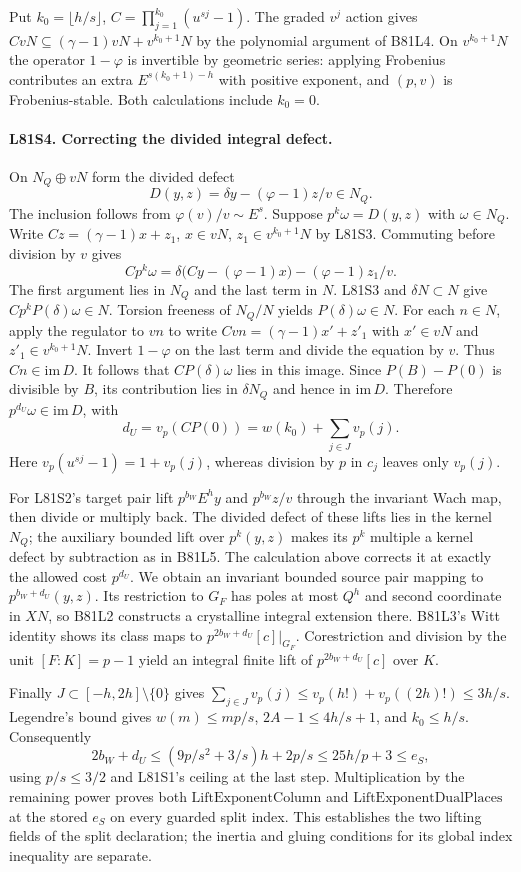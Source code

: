 Put $k_0=\lfloor h/s\rfloor$, $C=\prod_{j=1}^{k_0}(u^{sj}-1)$.
The graded $v^j$ action gives
$CvN\subseteq(\gamma-1)vN+v^{k_0+1}N$ by the polynomial
argument of B81L4. On $v^{k_0+1}N$ the operator $1-\varphi$
is invertible by geometric series: applying Frobenius contributes
an extra $E^{s(k_0+1)-h}$ with positive exponent, and $(p,v)$
is Frobenius-stable. Both calculations include $k_0=0$.

\paragraph{L81S4. Correcting the divided integral defect.}
On $N_Q\oplus vN$ form the divided defect
\[
           D(y,z)=\delta y-(\varphi-1)z/v\in N_Q .
\]
The inclusion follows from $\varphi(v)/v\sim E^s$. Suppose
$p^k\omega=D(y,z)$ with $\omega\in N_Q$. Write
$Cz=(\gamma-1)x+z_1$, $x\in vN$, $z_1\in v^{k_0+1}N$
by L81S3. Commuting before division by $v$ gives
\[
 Cp^k\omega=\delta\big(Cy-(\varphi-1)x\big)
                      -(\varphi-1)z_1/v .
\]
The first argument lies in $N_Q$ and the last term in $N$.
L81S3 and $\delta N\subset N$ give $Cp^k P(\delta)\omega\in N$.
Torsion freeness of $N_Q/N$ yields $P(\delta)\omega\in N$.
For each $n\in N$, apply the regulator to $vn$ to write
$Cvn=(\gamma-1)x'+z'_1$ with $x'\in vN$ and
$z'_1\in v^{k_0+1}N$. Invert $1-\varphi$ on the last term
and divide the equation by $v$. Thus $Cn\in\mathrm{im}\,D$.
It follows that $CP(\delta)\omega$ lies in this image.
Since $P(B)-P(0)$ is divisible by $B$, its contribution lies in
$\delta N_Q$ and hence in $\mathrm{im}\,D$. Therefore
$p^{d_U}\omega\in\mathrm{im}\,D$, with
\[
             d_U=v_p(CP(0))=w(k_0)+\sum_{j\in J}v_p(j).
\]
Here $v_p(u^{sj}-1)=1+v_p(j)$, whereas division by $p$ in
$c_j$ leaves only $v_p(j)$.

For L81S2's target pair lift $p^{b_W}E^hy$ and $p^{b_W}z/v$
through the invariant Wach map, then divide or multiply back.
The divided defect of these lifts lies in the kernel $N_Q$;
the auxiliary bounded lift over $p^k(y,z)$ makes its $p^k$
multiple a kernel defect by subtraction as in B81L5.
The calculation above corrects it at exactly the allowed cost
$p^{d_U}$. We obtain an invariant bounded source pair mapping
to $p^{b_W+d_U}(y,z)$. Its restriction to $G_F$ has poles at
most $Q^h$ and second coordinate in $XN$, so B81L2 constructs
a crystalline integral extension there. B81L3's Witt identity
shows its class maps to $p^{2b_W+d_U}[c]|_{G_F}$.
Corestriction and division by the unit $[F:K]=p-1$ yield an
integral finite lift of $p^{2b_W+d_U}[c]$ over $K$.

Finally $J\subset[-h,2h]\setminus\{0\}$ gives
$\sum_{j\in J} v_p(j)\le v_p(h!)+v_p((2h)!)\le3h/s$.
Legendre's bound gives $w(m)\le mp/s$, $2A-1\le4h/s+1$,
and $k_0\le h/s$. Consequently
\[
 2b_W+d_U\le(9p/s^2+3/s)h+2p/s
            \le25h/p+3\le e_S ,
\]
using $p/s\le3/2$ and L81S1's ceiling at the last step.
Multiplication by the remaining power proves both
$\mathrm{LiftExponentColumn}$ and $\mathrm{LiftExponentDualPlaces}$
at the stored $e_S$ on every guarded split index. This establishes
the two lifting fields of the split declaration; the inertia and
gluing conditions for its global index inequality are separate.
